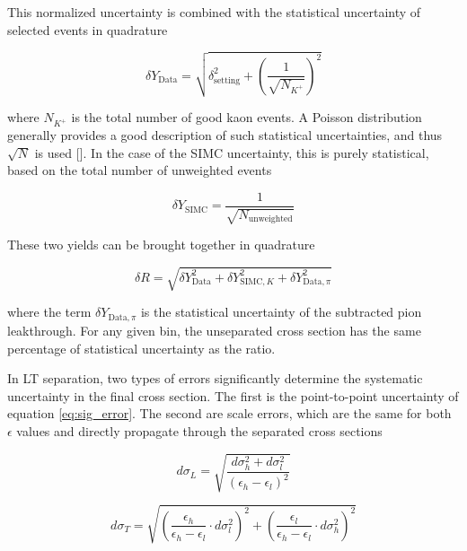 \documentclass[
]{report}
\begin{document}
\noindent This normalized uncertainty is combined with the statistical
uncertainty of selected events in quadrature

\begin{equation} 
    \delta Y_{\mathrm{Data}}=\sqrt{\delta_{\mathrm{setting}}^2+(\frac{1}{\sqrt{N_{K^+}}})^2}
  \label{eq:stat_error_yielddata} 
\end{equation}

\noindent where \(N_{K^+}\) is the total number of good kaon events. A
Poisson distribution generally provides a good description of such
statistical uncertainties, and thus \(\sqrt{N}\) is used
{[}\cite{bevington_data_2003}{]}. In the case of the SIMC uncertainty,
this is purely statistical, based on the total number of unweighted
events

\begin{equation} 
    \delta Y_{\mathrm{SIMC}}=\frac{1}{\sqrt{N_{\mathrm{unweighted}}}}
  \label{eq:stat_error_yieldsimc} 
\end{equation}

\noindent These two yields can be brought together in quadrature

\begin{equation} 
    \delta R=\sqrt{\delta Y_{\mathrm{Data}}^2+\delta Y_{\mathrm{SIMC,}K}^2+\delta Y_{\mathrm{Data,}\pi}^2}
  \label{eq:stat_error_ratio} 
\end{equation}

\noindent where the term \(\delta Y_{\mathrm{Data,}\pi}\) is the
statistical uncertainty of the subtracted pion leakthrough. For any
given bin, the unseparated cross section has the same percentage of
statistical uncertainty as the ratio.

In LT separation, two types of errors significantly determine the
systematic uncertainty in the final cross section. The first is the
point-to-point uncertainty of equation \ref{eq:sig_error}. The second
are scale errors, which are the same for both \(\epsilon\) values and
directly propagate through the separated cross sections

\begin{equation} 
    d\sigma_L=\sqrt{\frac{d\sigma_h^2+d\sigma_l^2}{(\epsilon_h-\epsilon_l)^2}}
  \label{eq:system_error_scale_l} 
\end{equation}

\begin{equation} 
    d\sigma_T=\sqrt{(\frac{\epsilon_h}{\epsilon_h-\epsilon_l}\cdot d\sigma_l^2)^2+(\frac{\epsilon_l}{\epsilon_h-\epsilon_l}\cdot d\sigma_h^2)^2}
  \label{eq:system_error_scale_t} 
\end{equation}
\end{document}
